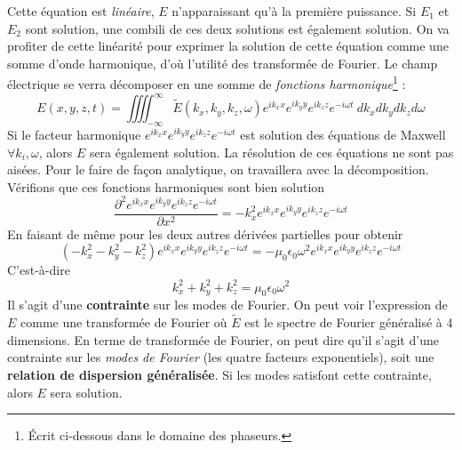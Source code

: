 Cette équation est \textit{linéaire}, $E$ n'apparaissant qu'à la première puissance. Si $E_1$ et 
$E_2$ sont solution, une combili de ces deux solutions est également solution. On va profiter 
de cette linéarité pour exprimer la solution de cette équation comme une somme d'onde harmonique, 
d'où l'utilité des transformée de Fourier. Le champ électrique se verra décomposer en une somme 
de \textit{fonctions harmonique}\footnote{Écrit ci-dessous dans le domaine des phaseurs.} :
\begin{equation}
E(x,y,z,t) = \iiiint_{-\infty}^\infty \tilde{E}(k_x,k_y,k_z,\omega)e^{ik_xx}e^{ik_yy}e^{ik_zz}
e^{-i\omega t}\ dk_xdk_ydk_zd\omega
\end{equation}
Si le facteur harmonique $e^{ik_xx}e^{ik_yy}e^{ik_zz}e^{-i\omega t}$  est solution des équations 
de Maxwell $\forall k_i,\omega$, alors $E$ sera également solution. La résolution de ces équations ne sont 
pas aisées. Pour le faire de façon analytique, on travaillera avec la décomposition. Vérifions 
que ces fonctions harmoniques sont bien solution
\begin{equation}
\dfrac{\partial^2 e^{ik_xx}e^{ik_yy}e^{ik_zz}e^{-i\omega t}}{\partial x^2} = -k_x^2 e^{ik_xx}e^{ik_yy}
e^{ik_zz}e^{-i\omega t}
\end{equation}
En faisant de même pour les deux autres dérivées partielles pour obtenir
\begin{equation}
(-k_x^2-k_y^2-k_z^2)e^{ik_xx}e^{ik_yy}e^{ik_zz}e^{-i\omega t} = -\mu_0\epsilon_0\omega^2 
e^{ik_xx}e^{ik_yy}e^{ik_zz}e^{-i\omega t}
\end{equation}
C'est-à-dire
\begin{equation}
k_x^2+k_y^2+k_z^2 = \mu_0\epsilon_0\omega^2
\end{equation}
Il s'agit d'une \textbf{contrainte} sur les modes de Fourier. On peut voir l'expression de $E$ 
comme une transformée de Fourier où $\tilde{E}$ est le spectre de Fourier généralisé à 4 
dimensions. En terme de transformée de Fourier, on peut dire qu'il s'agit d'une contrainte 
sur les \textit{modes de Fourier} (les quatre facteurs exponentiels), soit une \textbf{relation 
de dispersion généralisée}. Si les modes satisfont cette contrainte, alors $E$ sera solution.\\

